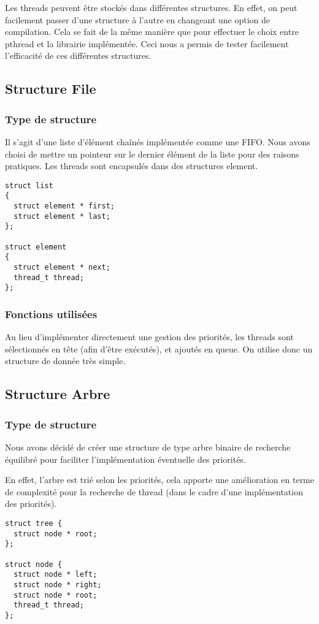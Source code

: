 
Les threads peuvent être stockés dans différentes structures. En effet, on peut facilement passer d'une structure à l'autre en changeant une option de compilation. Cela se fait de la même manière que pour effectuer le choix entre pthread et la librairie implémentée.
Ceci nous a permis de tester facilement l'efficacité de ces différentes structures.

\subsection{Structure File}
\subsubsection{Type de structure}
Il s'agit d'une liste d'élément chaînés implémentée comme une FIFO. Nous avons choisi de mettre un pointeur sur le dernier élément de la liste pour des raisons pratiques. Les threads sont encapsulés dans des structures element.
\begin{verbatim}
struct list 
{
  struct element * first;
  struct element * last;
};

struct element
{
  struct element * next;
  thread_t thread;
};

\end{verbatim}


\subsubsection{Fonctions utilisées}
Au lieu d'implémenter directement une gestion des priorités, les threads sont sélectionnés en tête (afin d'être exécutés), et ajoutés en queue. On utilise donc un structure de donnée très simple.

\subsection{Structure Arbre}
\subsubsection{Type de structure}
Nous avons décidé de créer une structure de type arbre binaire de recherche équilibré pour faciliter l'implémentation éventuelle des priorités.

En effet, l'arbre est trié selon les priorités, cela apporte une amélioration en terme de complexité pour la recherche de thread (dans le cadre d'une implémentation des priorités).

\begin{verbatim}
struct tree {
  struct node * root;
};

struct node {
  struct node * left;
  struct node * right;
  struct node * root;
  thread_t thread; 
};

\end{verbatim}

